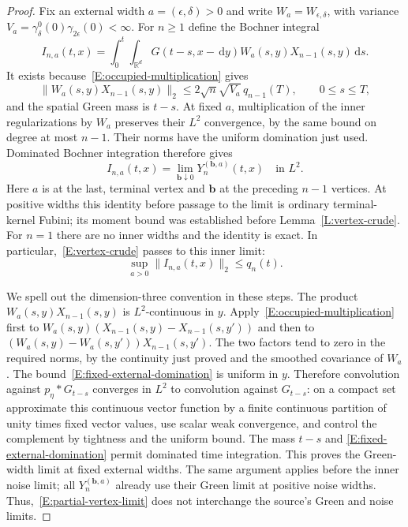 \documentclass[12pt]{article}
\numberwithin{equation}{section}
\theoremstyle{definition}
\newcommand{\R}{\mathbb{R}}
\newcommand{\ud}{\,\mathrm{d}}
\begin{document}
\begin{proof}
  Fix an external width $a=(\epsilon,\delta)>0$ and write
  $W_a=W_{\epsilon,\delta}$, with variance
  $V_a=\gamma^0_\delta(0)\gamma_{2\epsilon}(0)<\infty$.
  For $n\ge1$ define the Bochner integral
  \[
    I_{n,a}(t,x)=\int_0^t\int_{\R^d}G(t-s,x-\ud y)
    W_a(s,y)X_{n-1}(s,y)\ud s.
  \]
  It exists because~\eqref{E:occupied-multiplication} gives
  \begin{equation}\label{E:fixed-external-domination}
    \|W_a(s,y)X_{n-1}(s,y)\|_2
    \le2\sqrt n\sqrt{V_a}\,q_{n-1}(T),\qquad0\le s\le T,
  \end{equation}
  and the spatial Green mass is $t-s$.
  At fixed $a$, multiplication of the inner regularizations by $W_a$
  preserves their $L^2$ convergence, by the same bound on degree
  at most $n-1$. Their norms have the uniform domination just used.
  Dominated Bochner integration therefore gives
  \begin{equation}\label{E:partial-vertex-limit}
    I_{n,a}(t,x)=\lim_{\boldsymbol b\downarrow0}
    Y_n^{(\boldsymbol b,a)}(t,x)\quad\text{in }L^2.
  \end{equation}
  Here $a$ is at the last, terminal vertex and $\boldsymbol b$ at the
  preceding $n-1$ vertices. At positive widths this identity before
  passage to the limit is ordinary terminal-kernel Fubini; its moment
  bound was established before Lemma~\ref{L:vertex-crude}.
  For $n=1$ there are no inner widths and the identity is exact.
  In particular,~\eqref{E:vertex-crude} passes to this inner limit:
  \begin{equation}\label{E:mixed-vertex-bound}
    \sup_{a>0}\|I_{n,a}(t,x)\|_2\le q_n(t).
  \end{equation}

  We spell out the dimension-three convention in these steps.
  The product $W_a(s,y)X_{n-1}(s,y)$ is $L^2$-continuous in $y$.
  Apply~\eqref{E:occupied-multiplication} first to
  $W_a(s,y)(X_{n-1}(s,y)-X_{n-1}(s,y'))$ and then to
  $(W_a(s,y)-W_a(s,y'))X_{n-1}(s,y')$.
  The two factors tend to zero in the required norms, by the continuity
  just proved and the smoothed covariance of $W_a$.
  The bound~\eqref{E:fixed-external-domination} is uniform in $y$.
  Therefore convolution against $p_\eta*G_{t-s}$ converges in $L^2$
  to convolution against $G_{t-s}$: on a compact set approximate this
  continuous vector function by a finite continuous partition of unity
  times fixed vector values, use scalar weak convergence, and control
  the complement by tightness
  and the uniform bound. The mass $t-s$ and
  \eqref{E:fixed-external-domination} permit dominated time integration.
  This proves the Green-width limit at fixed external widths.
  The same argument applies before the inner noise limit; all
  $Y_n^{(\boldsymbol b,a)}$ already use their Green limit at positive
  noise widths. Thus,~\eqref{E:partial-vertex-limit} does not interchange
  the source's Green and noise limits.


\end{proof}
\end{document}
